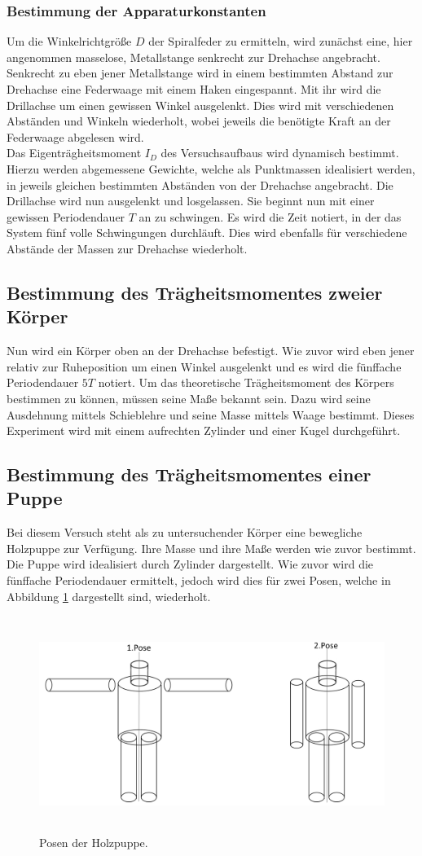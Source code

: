 \subsubsection{Bestimmung der Apparaturkonstanten}
Um die Winkelrichtgröße $D$ der Spiralfeder zu ermitteln, wird zunächst eine, hier angenommen masselose, Metallstange senkrecht zur Drehachse angebracht.
Senkrecht zu eben jener Metallstange wird in einem bestimmten Abstand zur Drehachse eine Federwaage mit einem Haken eingespannt.
Mit ihr wird die Drillachse um einen gewissen Winkel ausgelenkt.
Dies wird mit verschiedenen Abständen und Winkeln wiederholt, wobei jeweils die benötigte Kraft an der Federwaage abgelesen wird.\\
Das Eigenträgheitsmoment $I_{D}$ des Versuchsaufbaus wird dynamisch bestimmt.
Hierzu werden abgemessene Gewichte, welche als Punktmassen idealisiert werden, in jeweils gleichen bestimmten Abständen von der Drehachse angebracht.
Die Drillachse wird nun ausgelenkt und losgelassen.
Sie beginnt nun mit einer gewissen Periodendauer $T$ an zu schwingen.
Es wird die Zeit notiert, in der das System fünf volle Schwingungen durchläuft.
Dies wird ebenfalls für verschiedene Abstände der Massen zur Drehachse wiederholt.

\subsection{Bestimmung des Trägheitsmomentes zweier Körper}
Nun wird ein Körper oben an der Drehachse befestigt.
Wie zuvor wird eben jener relativ zur Ruheposition um einen Winkel ausgelenkt und es wird die fünffache Periodendauer $5T$ notiert.
Um das theoretische Trägheitsmoment des Körpers bestimmen zu können, müssen seine Maße bekannt sein.
Dazu wird seine Ausdehnung mittels Schieblehre und seine Masse mittels Waage bestimmt.
Dieses Experiment wird mit einem aufrechten Zylinder und einer Kugel durchgeführt.

\subsection{Bestimmung des Trägheitsmomentes einer Puppe}
Bei diesem Versuch steht als zu untersuchender Körper eine bewegliche Holzpuppe zur Verfügung.
Ihre Masse und ihre Maße werden wie zuvor bestimmt.
Die Puppe wird idealisiert durch Zylinder dargestellt.
Wie zuvor wird die fünffache Periodendauer ermittelt, jedoch wird dies für zwei Posen, welche in Abbildung \ref{df:2} dargestellt sind, wiederholt.

\begin{figure}
  \centering
  \includegraphics[height=7cm]{Posen.png}
  \caption{Posen der Holzpuppe.}
  \label{df:2}
\end{figure}

